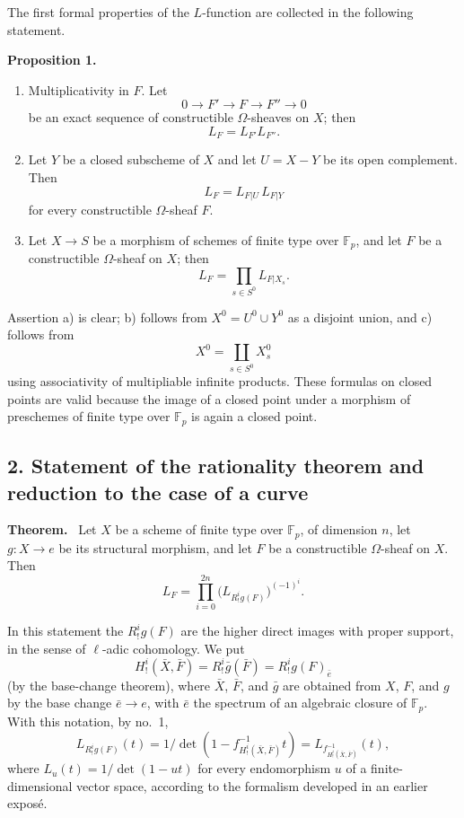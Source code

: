 \documentclass[11pt]{article}
\newenvironment{statement}[1]{\par\medskip\noindent\textbf{#1.}\ }{\par\medskip}
\begin{document}
The first formal properties of the $L$-function are collected in the following statement.

\begin{statement}{Proposition 1}
\begin{enumerate}[label=\alph*)]
\item Multiplicativity in $F$. Let
\[
0\longrightarrow F'\longrightarrow F\longrightarrow F''\longrightarrow0
\]
be an exact sequence of constructible $\Omega$-sheaves on $X$; then
\[
L_F=L_{F'}L_{F''}.
\]
\item Let $Y$ be a closed subscheme of $X$ and let $U=X-Y$ be its open complement. Then
\[
L_F=L_{F|U}\,L_{F|Y}
\]
for every constructible $\Omega$-sheaf $F$.
\item Let $X\to S$ be a morphism of schemes of finite type over $\mathbb F_p$, and let $F$ be a constructible $\Omega$-sheaf on $X$; then
\[
L_F=\prod_{s\in S^0}L_{F|X_s}.
\]
\end{enumerate}
\end{statement}

Assertion a) is clear; b) follows from $X^0=U^0\cup Y^0$ as a disjoint union, and c) follows from
\[
X^0=\coprod_{s\in S^0}X_s^0
\]
using associativity of multipliable infinite products. These formulas on closed points are valid because the image of a closed point under a morphism of preschemes of finite type over $\mathbb F_p$ is again a closed point.

\subsection*{2. Statement of the rationality theorem and reduction to the case of a curve}

\begin{statement}{Theorem}
Let $X$ be a scheme of finite type over $\mathbb F_p$, of dimension $n$, let $g:X\to e$ be its structural morphism, and let $F$ be a constructible $\Omega$-sheaf on $X$. Then
\[
L_F=\prod_{i=0}^{2n}\bigl(L_{R^i_!g(F)}\bigr)^{(-1)^i}.
\tag{1}
\]
\end{statement}

In this statement the $R^i_!g(F)$ are the higher direct images with proper support, in the sense of $\ell$-adic cohomology. We put
\[
H^i_!(\bar X,\bar F)=R^i_!\bar g(\bar F)=R^i_!g(F)_{\bar e}
\]
(by the base-change theorem), where $\bar X$, $\bar F$, and $\bar g$ are obtained from $X$, $F$, and $g$ by the base change $\bar e\to e$, with $\bar e$ the spectrum of an algebraic closure of $\mathbb F_p$. With this notation, by no.~1,
\[
L_{R^i_!g(F)}(t)=1/\det(1-f^{-1}_{H^i_!(\bar X,\bar F)}t)
 =L_{f^{-1}_{H^i_!(\bar X,\bar F)}}(t),
\]
where $L_u(t)=1/\det(1-ut)$ for every endomorphism $u$ of a finite-dimensional vector space, according to the formalism developed in an earlier exposé.
\end{document}
